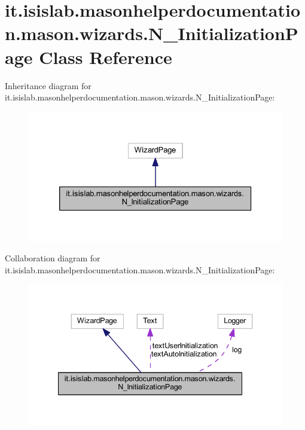 \hypertarget{classit_1_1isislab_1_1masonhelperdocumentation_1_1mason_1_1wizards_1_1_n___initialization_page}{\section{it.\-isislab.\-masonhelperdocumentation.\-mason.\-wizards.\-N\-\_\-\-Initialization\-Page Class Reference}
\label{classit_1_1isislab_1_1masonhelperdocumentation_1_1mason_1_1wizards_1_1_n___initialization_page}
}


Inheritance diagram for it.\-isislab.\-masonhelperdocumentation.\-mason.\-wizards.\-N\-\_\-\-Initialization\-Page\-:\nopagebreak
\begin{figure}[H]
\begin{center}
\leavevmode
\includegraphics[width=326pt]{classit_1_1isislab_1_1masonhelperdocumentation_1_1mason_1_1wizards_1_1_n___initialization_page__inherit__graph}
\end{center}
\end{figure}


Collaboration diagram for it.\-isislab.\-masonhelperdocumentation.\-mason.\-wizards.\-N\-\_\-\-Initialization\-Page\-:\nopagebreak
\begin{figure}[H]
\begin{center}
\leavevmode
\includegraphics[width=340pt]{classit_1_1isislab_1_1masonhelperdocumentation_1_1mason_1_1wizards_1_1_n___initialization_page__coll__graph}
\end{center}
\end{figure}
